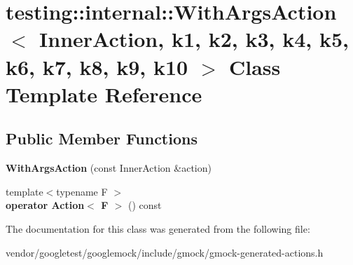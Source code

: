 \hypertarget{classtesting_1_1internal_1_1WithArgsAction}{}\section{testing\+:\+:internal\+:\+:With\+Args\+Action$<$ Inner\+Action, k1, k2, k3, k4, k5, k6, k7, k8, k9, k10 $>$ Class Template Reference}
\label{classtesting_1_1internal_1_1WithArgsAction}
\subsection*{Public Member Functions}
\begin{DoxyCompactItemize}
\item 
{\bfseries With\+Args\+Action} (const Inner\+Action \&action)\hypertarget{classtesting_1_1internal_1_1WithArgsAction_ab408f9c56c8f25564ef554b984e1c926}{}\label{classtesting_1_1internal_1_1WithArgsAction_ab408f9c56c8f25564ef554b984e1c926}

\item 
{\footnotesize template$<$typename F $>$ }\\{\bfseries operator Action$<$ F $>$} () const \hypertarget{classtesting_1_1internal_1_1WithArgsAction_a33a5550ee1fa0b86b5d1cc918e573e97}{}\label{classtesting_1_1internal_1_1WithArgsAction_a33a5550ee1fa0b86b5d1cc918e573e97}

\end{DoxyCompactItemize}


The documentation for this class was generated from the following file\+:\begin{DoxyCompactItemize}
\item 
vendor/googletest/googlemock/include/gmock/gmock-\/generated-\/actions.\+h\end{DoxyCompactItemize}
